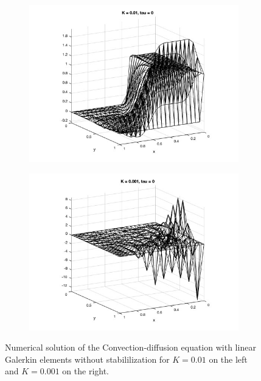 \documentclass[hidelinks]{article}
\begin{document}
\begin{figure}[H]\centering
    
    \begin{subfigure}[t]{0.45\textwidth}
        \centering
        \includegraphics[width=\textwidth]{pic/k001t0.jpg}
    \end{subfigure}
    \hfill
    \begin{subfigure}[t]{0.45\textwidth}
        \centering
        \includegraphics[width=\textwidth]{pic/k0001t0.jpg}
    \end{subfigure}

    \caption{Numerical solution of the Convection-diffusion equation with linear Galerkin elements without stabililization for $K=0.01$ on the left and $K=0.001$ on the right.}
    \label{fig:nostab}
\end{figure}
\end{document}
